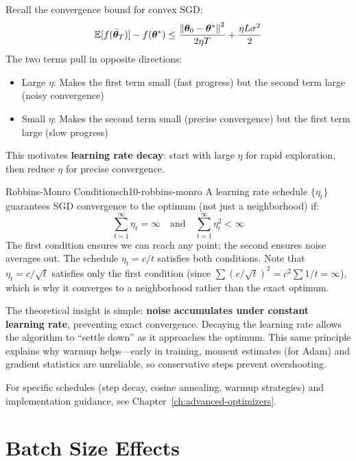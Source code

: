 \documentclass[../../main.tex]{subfiles}
\begin{document}
\begin{principle}
Recall the convergence bound for convex SGD:
\[
    \operatorname{\mathbb{E}}[f(\bar{\boldsymbol{\theta}}_T)] - f(\boldsymbol{\theta}^*) \leq \frac{\left\lVert \boldsymbol{\theta}_0 - \boldsymbol{\theta}^* \right\rVert^2}{2\eta T} + \frac{\eta L \sigma^2}{2}
\]
The two terms pull in opposite directions:
\begin{itemize}
    \item Large $\eta$: Makes the first term small (fast progress) but the second term large (noisy convergence)
    \item Small $\eta$: Makes the second term small (precise convergence) but the first term large (slow progress)
\end{itemize}
This motivates \textbf{learning rate decay}: start with large $\eta$ for rapid exploration, then reduce $\eta$ for precise convergence.
\end{principle}

\begin{theorem}{Robbins-Monro Conditions}{ch10-robbins-monro}
A learning rate schedule $\{\eta_t\}$ guarantees SGD convergence to the optimum (not just a neighborhood) if:
\[
    \sum_{t=1}^{\infty} \eta_t = \infty \quad \text{and} \quad \sum_{t=1}^{\infty} \eta_t^2 < \infty
\]
The first condition ensures we can reach any point; the second ensures noise averages out. The schedule $\eta_t = c/t$ satisfies both conditions. Note that $\eta_t = c/\sqrt{t}$ satisfies only the first condition (since $\sum (c/\sqrt{t})^2 = c^2 \sum 1/t = \infty$), which is why it converges to a neighborhood rather than the exact optimum.
\end{theorem}

\begin{keyconcept}
The theoretical insight is simple: \textbf{noise accumulates under constant learning rate}, preventing exact convergence. Decaying the learning rate allows the algorithm to ``settle down'' as it approaches the optimum. This same principle explains why warmup helps---early in training, moment estimates (for Adam) and gradient statistics are unreliable, so conservative steps prevent overshooting.

For specific schedules (step decay, cosine annealing, warmup strategies) and implementation guidance, see Chapter~\ref{ch:advanced-optimizers}.
\end{keyconcept}

\section{Batch Size Effects}
\label{sec:ch10-batch-size}
\end{document}
